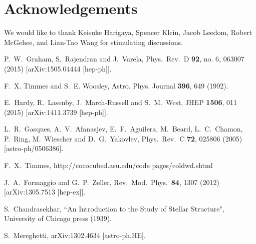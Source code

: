 \documentclass[twocolumn,preprintnumbers,amsmath,amssymb,prl, superscriptaddress]{revtex4}
\begin{document}
\section*{Acknowledgements}
We would like to thank Keisuke Harigaya, Spencer Klein, Jacob Leedom, Robert McGehee, and Lian-Tao Wang for stimulating discussions.

\begin{thebibliography}{99}


  P.~W.~Graham, S.~Rajendran and J.~Varela,
  Phys.\ Rev.\ D {\bf 92}, no. 6, 063007 (2015)
  [arXiv:1505.04444 [hep-ph]].


 F.~X. Timmes and S.~E. Woosley, Astro. Phys. Journal {\bf 396}, 649 (1992).

  E.~Hardy, R.~Lasenby, J.~March-Russell and S.~M.~West,
  JHEP {\bf 1506}, 011 (2015)
  [arXiv:1411.3739 [hep-ph]].


  L.~R.~Gasques, A.~V.~Afanasjev, E.~F.~Aguilera, M.~Beard, L.~C.~Chamon, P.~Ring, M.~Wiescher and D.~G.~Yakovlev,
  Phys.\ Rev.\ C {\bf 72}, 025806 (2005)
  [astro-ph/0506386].


F.~X.~Timmes, http://cococubed.asu.edu/code pages/coldwd.shtml

  J.~A.~Formaggio and G.~P.~Zeller,
  Rev.\ Mod.\ Phys.\  {\bf 84}, 1307 (2012)
  [arXiv:1305.7513 [hep-ex]].


S.~Chandrasekhar, ``An Introduction to the Study of Stellar Structure", University of Chicago press (1939).

  S.~Mereghetti,
  arXiv:1302.4634 [astro-ph.HE].



\end{thebibliography}
\end{document}
